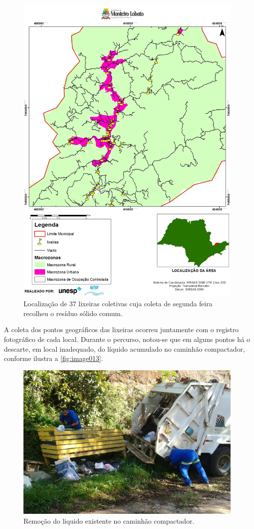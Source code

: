 	\begin{figure}
		\centering
		\includegraphics[width=0.75\linewidth]{produtos/prodtres/image012}
		\caption{Localização de 37 lixeiras coletivas cuja coleta de segunda feira recolheu o resíduo sólido comum.}
		\label{fig:image012}
	\end{figure}
	
	A coleta dos pontos geográficos das lixeiras ocorreu juntamente com o registro fotográfico de cada local.  Durante o percurso, notou-se que em alguns pontos há o descarte, em local inadequado, do líquido acumulado no caminhão compactador, conforme ilustra a \autoref{fig:image013}.
	
	\begin{figure}
		\centering
		\includegraphics[width=0.75\linewidth]{produtos/prodtres/image013}
		\caption{Remoção do liquido existente no caminhão compactador.}
		\label{fig:image013}
	\end{figure}
	
